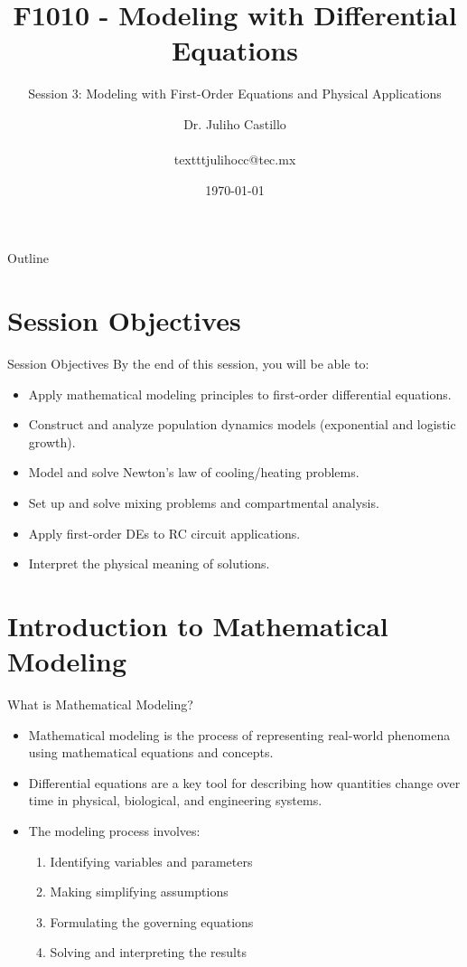 \documentclass[10pt,aspectratio=169]{beamer}
\title{F1010 - Modeling with Differential Equations}
\subtitle{Session 3: Modeling with First-Order Equations and Physical Applications}
\author{Dr. Juliho Castillo\\ \\texttt{julihocc@tec.mx}}
\institute{Tec de Monterrey}
\date{\today}
\begin{document}
\maketitle

\begin{frame}{Outline}
    \tableofcontents
\end{frame}

\section{Session Objectives}
\begin{frame}{Session Objectives}
    By the end of this session, you will be able to:
    \begin{itemize}
        \item Apply mathematical modeling principles to first-order differential equations.
        \item Construct and analyze population dynamics models (exponential and logistic growth).
        \item Model and solve Newton's law of cooling/heating problems.
        \item Set up and solve mixing problems and compartmental analysis.
        \item Apply first-order DEs to RC circuit applications.
        \item Interpret the physical meaning of solutions.
    \end{itemize}
\end{frame}

\section{Introduction to Mathematical Modeling}
\begin{frame}{What is Mathematical Modeling?}
    \begin{itemize}
        \item Mathematical modeling is the process of representing real-world phenomena using mathematical equations and concepts.
        \item Differential equations are a key tool for describing how quantities change over time in physical, biological, and engineering systems.
        \item The modeling process involves:
        \begin{enumerate}
            \item Identifying variables and parameters
            \item Making simplifying assumptions
            \item Formulating the governing equations
            \item Solving and interpreting the results
        \end{enumerate}
    \end{itemize}
\end{frame}
\end{document}
